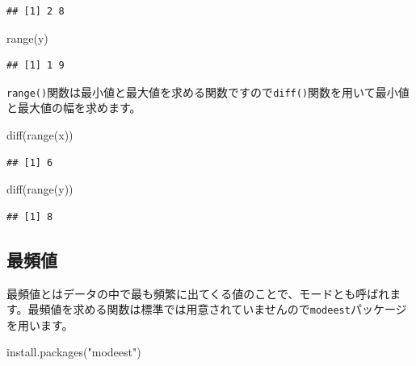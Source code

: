 \documentclass[
  12pt,
]{book}
\newenvironment{Shaded}{\begin{snugshade}}{\end{snugshade}}
\newcommand{\FunctionTok}[1]{\textcolor[rgb]{0.00,0.00,0.00}{#1}}
\newcommand{\NormalTok}[1]{#1}
\newcommand{\StringTok}[1]{\textcolor[rgb]{0.31,0.60,0.02}{#1}}
\begin{document}
\begin{verbatim}
## [1] 2 8
\end{verbatim}

\begin{Shaded}
\begin{Highlighting}[]
\FunctionTok{range}\NormalTok{(y)}
\end{Highlighting}
\end{Shaded}

\begin{verbatim}
## [1] 1 9
\end{verbatim}

\texttt{range()}関数は最小値と最大値を求める関数ですので\texttt{diff()}関数を用いて最小値と最大値の幅を求めます。

\begin{Shaded}
\begin{Highlighting}[]
\FunctionTok{diff}\NormalTok{(}\FunctionTok{range}\NormalTok{(x))}
\end{Highlighting}
\end{Shaded}

\begin{verbatim}
## [1] 6
\end{verbatim}

\begin{Shaded}
\begin{Highlighting}[]
\FunctionTok{diff}\NormalTok{(}\FunctionTok{range}\NormalTok{(y))}
\end{Highlighting}
\end{Shaded}

\begin{verbatim}
## [1] 8
\end{verbatim}

\hypertarget{ux6700ux983bux5024}{%
\subsection{最頻値}\label{ux6700ux983bux5024}}

最頻値とはデータの中で最も頻繁に出てくる値のことで、モードとも呼ばれます。最頻値を求める関数は標準では用意されていませんので\texttt{modeest}パッケージを用います。

\begin{Shaded}
\begin{Highlighting}[]
\FunctionTok{install.packages}\NormalTok{(}\StringTok{"modeest"}\NormalTok{)}
\end{Highlighting}
\end{Shaded}
\end{document}
